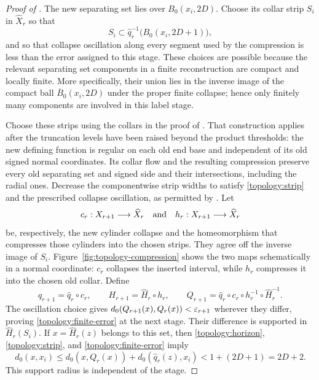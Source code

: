\begin{proof}[Proof of ]
The new separating set lies over $B_0(x_i,2D)$.  Choose its collar strip $S_i$ in
$\widehat X_r$ so that
\begin{equation}\label{topology:strip}
 S_i\subset\widehat q_r^{-1}\bigl(B_0(x_i,2D+1)\bigr),
\end{equation}
and so that collapse oscillation along every segment used by the
compression is less than the error assigned to this stage.  These
choices are possible because the relevant separating set components in a finite
reconstruction are compact and locally finite.  More specifically,
their union lies in the inverse image of the compact ball
$\overline B_0(x_i,2D)$ under the proper finite collapse; hence only
finitely many components are involved in this label stage.

Choose these strips using the collars in the proof of
. That construction applies after the
truncation levels have been raised beyond the product thresholds: the new
defining function is regular on each old end base and independent of its
old signed normal coordinates. Its collar flow and the resulting
compression preserve every old separating set and signed side and their
intersections, including the radial ones. Decrease the componentwise strip widths to satisfy
\eqref{topology:strip} and the prescribed collapse oscillation, as
permitted by .
Let
\[
 c_r:X_{r+1}\longrightarrow\widehat X_r
 \quad\hbox{and}\quad
 h_r:X_{r+1}\longrightarrow\widehat X_r
\]
be, respectively, the new cylinder collapse and the homeomorphism that
compresses those cylinders into the chosen strips.  They agree off
the inverse image of $S_i$. Figure~\ref{fig:topology-compression} shows
the two maps schematically in a normal coordinate: $c_r$ collapses the
inserted interval, while $h_r$ compresses it into the chosen old collar.
Define
\begin{equation}\label{topology:recursion}
 q_{r+1}=\widehat q_r\circ c_r,
 \qquad H_{r+1}=\widehat H_r\circ h_r,
 \qquad
 Q_{r+1}=\widehat q_r\circ c_r\circ h_r^{-1}
                         \circ\widehat H_r^{-1}.
\end{equation}
The oscillation choice gives
$d_0(Q_{r+1}(x),Q_r(x))<\varepsilon_{r+1}$ wherever they differ, proving
\eqref{topology:finite-error} at the next stage.  Their difference is
supported in $\widehat H_r(S_i)$.  If
$x=\widehat H_r(z)$ belongs to this set, then
\eqref{topology:horizon}, \eqref{topology:strip}, and
\eqref{topology:finite-error} imply
\begin{equation}\label{topology:fixed-support}
 d_0(x,x_i)
 \le d_0(x,Q_r(x))+d_0(\widehat q_r(z),x_i)
 <1+(2D+1)=2D+2.
\end{equation}
This support radius is independent of the stage.


\end{proof}
